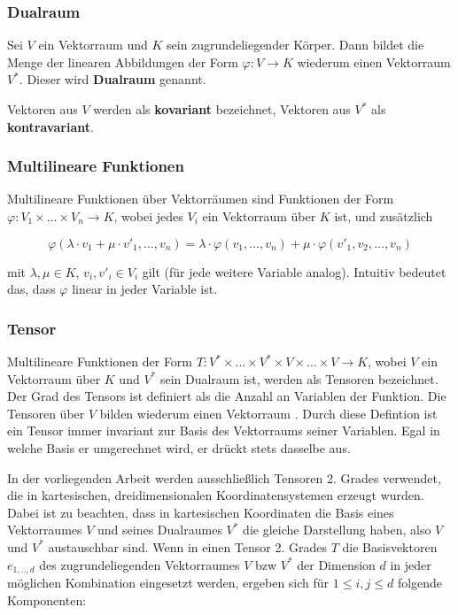 \documentclass[a4paper,fontsize=12pt,toc=bib,halfparskip]{scrartcl}
\begin{document}
\subsubsection{Dualraum}
Sei $V$ ein Vektorraum und $K$ sein zugrundeliegender K\"orper. Dann bildet die Menge der linearen Abbildungen der Form $\varphi: V \rightarrow K$ wiederum einen Vektorraum $V^*$. Dieser wird \textbf{Dualraum} genannt\cite[S.~203]{bowen2008introduction}. 

Vektoren aus $V$ werden als \textbf{kovariant} bezeichnet, Vektoren aus $V^*$ als \textbf{kontravariant}\cite[S.~205]{bowen2008introduction}.

\subsubsection{Multilineare Funktionen}
Multilineare Funktionen \"uber Vektorr\"aumen sind Funktionen der Form $\varphi: V_1 \times \dots \times V_n \rightarrow K$, wobei jedes $V_i$ ein Vektorraum \"uber $K$ ist, und zus\"atzlich 

\begin{equation}
	\varphi(\lambda \cdot v_1 + \mu \cdot v'_1, \dots, v_n) = \lambda \cdot \varphi(v_1, \dots, v_n) + \mu \cdot \varphi(v'_1, v_2, \dots, v_n)
\end{equation}

mit $\lambda, \mu \in K$, $v_i, v'_i \in V_i$ gilt (f\"ur jede weitere Variable analog). Intuitiv bedeutet das, dass $\varphi$ linear in jeder Variable ist\cite[S.~204, 218]{bowen2008introduction}.





\subsubsection{Tensor}
Multilineare Funktionen der Form $T: V^*\times\dots\times V^*\times V \times \dots \times V \rightarrow K$, wobei $V$ ein Vektorraum \"uber $K$ und $V^*$ sein Dualraum ist, werden als Tensoren bezeichnet\cite[S.~218]{bowen2008introduction}. Der Grad des Tensors ist definiert als die Anzahl an Variablen der Funktion. Die Tensoren \"uber $V$ bilden wiederum einen Vektorraum \cite[S.~220]{bowen2008introduction}. Durch diese Defintion ist ein Tensor immer invariant zur Basis des Vektorraums seiner Variablen. Egal in welche Basis er umgerechnet wird, er dr\"uckt stets dasselbe aus.

In der vorliegenden Arbeit werden ausschlie{\ss}lich Tensoren 2. Grades verwendet, die in kartesischen, dreidimensionalen Koordinatensystemen erzeugt wurden. Dabei ist zu beachten, dass in kartesischen Koordinaten die Basis eines Vektorraumes $V$ und seines Dualraumes $V^*$ die gleiche Darstellung haben, also $V$ und $V^*$ austauschbar sind. Wenn in einen Tensor 2. Grades $T$ die Basisvektoren $e_{1,..,d}$ des zugrundeliegenden Vektorraumes $V$ bzw $V^*$ der Dimension $d$ in jeder m\"oglichen Kombination eingesetzt werden, ergeben sich f\"ur $1\leq i,j\leq d$ folgende Komponenten:
\end{document}
